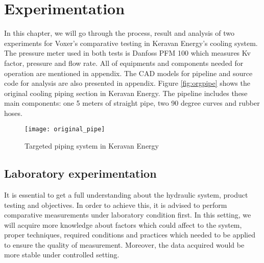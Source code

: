 
\chapter{Experimentation}
In this chapter, we will go through the process, result and analysis of two experiments for Voxer's comparative testing in Keravan Energy's cooling system. The pressure meter used in both tests is Danfoss PFM 100 \cite{danfoss:web} which measures Kv factor, pressure and flow rate. All of equipments and components needed for operation are mentioned in appendix. The CAD models for pipeline and source code for analysis are also presented in appendix. Figure \vref{fig:orgpipe} shows the original cooling piping section in Keravan Energy. The pipeline includes these main components: one 5 meters of straight pipe, two 90 degree curves and rubber hoses.
\begin{figure}[h]
  \centering
  \texttt{[image: original\_pipe]}
  \caption{ Targeted piping system in Keravan Energy}
  \label{fig:orgpipe}
\end{figure}
\section{Laboratory experimentation}
It is essential to get a full understanding about the hydraulic system, product testing and objectives. In order to achieve this, it is advised to perform comparative measurements under laboratory condition first. In this setting, we will acquire more knowledge about factors which could affect to the system, proper techniques, required conditions and practices which needed to be applied to ensure the quality of measurement. Moreover, the data acquired would be more stable under controlled setting.
